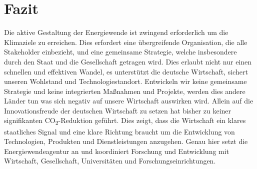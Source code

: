 \section{Fazit}

Die aktive Gestaltung der Energiewende ist zwingend erforderlich um die Klimaziele zu erreichen.
Dies erfordert eine übergreifende Organisation, die alle Stakeholder einbezieht, und eine gemeinsame Strategie, welche insbesondere durch den Staat und die Gesellschaft getragen wird.
Dies erlaubt nicht nur einen schnellen und effektiven Wandel, es unterstützt die deutsche Wirtschaft, sichert unseren Wohlstand und Technologiestandort.
Entwickeln wir keine gemeinsame Strategie und keine integrierten Maßnahmen und Projekte, werden dies andere Länder tun was sich negativ auf unsere Wirtschaft auswirken wird.
Allein auf die Innovationsfreude der deutschen Wirtschaft zu setzen hat bisher zu keiner signifikanten CO\textsubscript{2}-Reduktion geführt.
Dies zeigt, dass die Wirtschaft ein klares staatliches Signal und eine klare Richtung braucht um die Entwicklung von Technologien, Produkten und Dienstleistungen anzugehen.
Genau hier setzt die Energiewendeagentur an und koordiniert Forschung und Entwicklung mit Wirtschaft, Gesellschaft, Universitäten und Forschungseinrichtungen.

